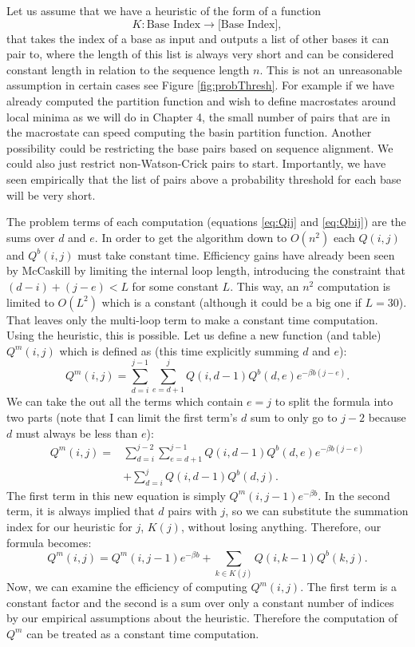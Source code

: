 Let us assume that we have a heuristic of the form of a function 
\begin{equation}
K : \text{Base Index} \to \text{[Base Index]},
\end{equation}
that takes the index of a base as input and outputs a list of other
bases it can pair to, where the length of this list is always very
short and can be considered constant length in relation to the
sequence length $n$. This is not an unreasonable assumption in certain
cases see Figure \ref{fig:probThresh}. For example if we have already
computed the partition function and wish to define macrostates around
local minima as we will do in Chapter 4, the small number of pairs
that are in the macrostate can speed computing the basin partition
function. Another possibility could be restricting the base pairs
based on sequence alignment. We could also just restrict
non-Watson-Crick pairs to start. Importantly, we have seen empirically
that the list of pairs above a probability threshold for each base will
be very short.

The problem terms of each computation (equations \ref{eq:Qij} and
\ref{eq:Qbij}) are the sums over $d$ and $e$. In order to get the
algorithm down to $O(n^2)$ each $Q(i,j)$ and $Q^b(i,j)$ must take
constant time. Efficiency gains have already been seen by McCaskill by
limiting the internal loop length, introducing the constraint that
$(d-i) + (j-e) < L$ for some constant $L$. This way, an $n^2$
computation is limited to $O(L^2)$ which is a constant (although it
could be a big one if $L=30$). That leaves only the multi-loop term to
make a constant time computation. Using the heuristic, this is
possible. Let us define a new function (and table) $Q^m(i, j)$ which
is defined as (this time explicitly summing $d$ and $e$):
\begin{equation}
Q^m(i, j) = \sum_{d = i}^{j-1}\sum_{e = d+1}^{j} Q(i, d-1)Q^b(d,e)e^{-\beta b(j-e)}.
\end{equation}
We can take the out all the terms which contain $e = j$ to split the
formula into two parts (note that I can limit the first term's $d$ sum
to only go to $j-2$ because $d$ must always be less than $e$):
\begin{equation}
\begin{split}
Q^m(i, j) =& \sum_{d = i}^{j-2}\sum_{e = d+1}^{j-1} Q(i, d-1)Q^b(d,e)e^{-\beta b(j-e)} \\
&+ \sum_{d = i}^{j} Q(i, d-1)Q^b(d,j).
\end{split}
\end{equation}
The first term in this new equation is simply
$Q^m(i,j-1)e^{-\beta b}$. In the second term, it is always implied that
$d$ pairs with $j$, so we can substitute the summation index for our
heuristic for $j$, $K(j)$, without losing anything. Therefore, our
formula becomes:
\begin{equation}
Q^m(i, j) = Q^m(i, j -1) e^{-\beta b} + \sum_{k \in K(j)} Q(i, k - 1) Q^b(k, j).
\end{equation}
Now, we can examine the efficiency of computing $Q^m(i,j)$. The first
term is a constant factor and the second is a sum over only a constant
number of indices by our empirical assumptions about the
heuristic. Therefore the computation of $Q^m$ can be treated as a
constant time computation.


